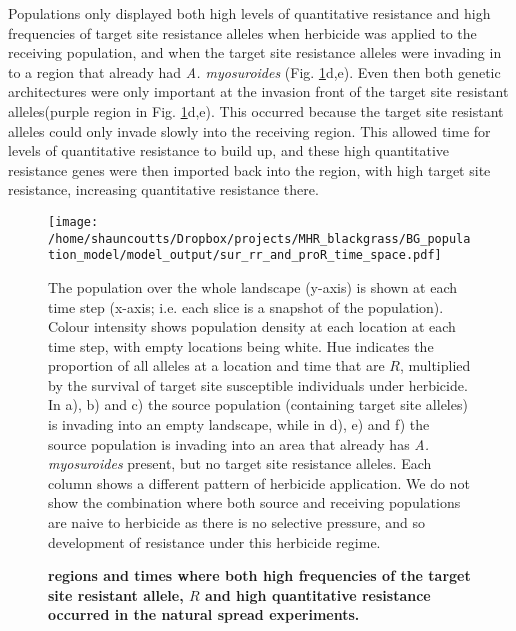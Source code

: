 \documentclass[10pt,letterpaper]{article}
\begin{document}
Populations only displayed both high levels of quantitative resistance and high frequencies of target site resistance alleles when herbicide was applied to the receiving population, and when the target site resistance alleles were invading in to a region that already had \textit{A. myosuroides} (Fig. \ref{fig:both_natspr}d,e). Even then both genetic architectures were only important at the invasion front of the target site resistant alleles(purple region in Fig. \ref{fig:both_natspr}d,e). This occurred because the target site resistant alleles could only invade slowly into the receiving region. This allowed time for levels of quantitative resistance to build up, and these high quantitative resistance genes were then imported back into the region, with high target site resistance, increasing quantitative resistance there.        

\begin{figure}[!h] 
	\texttt{[image: /home/shauncoutts/Dropbox/projects/MHR\_blackgrass/BG\_population\_model/model\_output/sur\_rr\_and\_proR\_time\_space.pdf]}
\caption{\bf regions and times where both high frequencies of the target site resistant allele, $R$ and high quantitative resistance occurred in the natural spread experiments.} The population over the whole landscape (y-axis) is shown at each time step (x-axis; i.e. each slice is a snapshot of the population).  Colour intensity shows population density at each location at each time step, with empty locations being white. Hue indicates the proportion of all alleles at a location and time that are $R$, multiplied by the survival of target site susceptible individuals under herbicide. In a), b) and c) the source population (containing target site alleles) is invading into an empty landscape, while in d), e) and f) the source population is invading into an area that already has \textit{A. myosuroides} present, but no target site resistance alleles. Each column shows a different pattern of herbicide application. We do not show the combination where both source and receiving populations are naive to herbicide as there is no selective pressure, and so development of resistance under this herbicide regime.    
\label{fig:both_natspr}
\end{figure}
\end{document}
